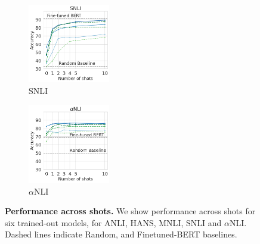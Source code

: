 \begin{figure}[t]
\begin{subfigure}[b]{0.19\textwidth}
    \includegraphics[height=3.45cm, trim=25mm 0 0 0, clip]{figures/snli}
    \caption{SNLI}
    \label{fig:snli}
    \end{subfigure}
    \begin{subfigure}[b]{0.19\textwidth}
    \centering
    \includegraphics[height=3.45cm, trim=25mm 0 0 0, clip]{figures/abductivenli}
    \caption{$\alpha$NLI}
    \label{fig:alphanli}
    \end{subfigure}
    \caption{\textbf{Performance across shots.} We show performance across shots for six trained-out models, for ANLI, HANS, MNLI, SNLI and $\alpha$NLI. Dashed lines indicate Random, and Finetuned-BERT baselines.}\label{fig:shot_performance}
\end{figure}


